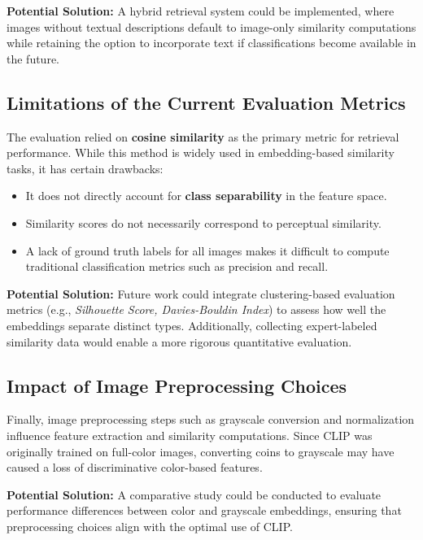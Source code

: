 \documentclass[nolibertine, english, algorithm, nomencl, minted]{ttlab-qualify}
\begin{document}
\textbf{Potential Solution:} A hybrid retrieval system could be implemented, where images without textual descriptions 
default to image-only similarity computations while retaining the option to incorporate text if classifications become 
available in the future.

\subsection{Limitations of the Current Evaluation Metrics}
\label{subsec:evaluation_limits}

The evaluation relied on \textbf{cosine similarity} as the primary metric for retrieval performance. 
While this method is widely used in embedding-based similarity tasks, it has certain drawbacks:
\begin{itemize}
    \item It does not directly account for \textbf{class separability} in the feature space.
    \item Similarity scores do not necessarily correspond to perceptual similarity.
    \item A lack of ground truth labels for all images makes it difficult to compute traditional classification metrics such 
    as precision and recall.
\end{itemize}

\textbf{Potential Solution:} Future work could integrate clustering-based evaluation metrics 
(e.g., \textit{Silhouette Score, Davies-Bouldin Index}) to assess how well the embeddings separate distinct types. 
Additionally, collecting expert-labeled similarity data would enable a more rigorous quantitative evaluation.

\subsection{Impact of Image Preprocessing Choices}
\label{subsec:image_preprocessing}

Finally, image preprocessing steps such as grayscale conversion and normalization influence feature extraction 
and similarity computations. Since CLIP was originally trained on full-color images, converting coins to grayscale may have 
caused a loss of discriminative color-based features.

\textbf{Potential Solution:} A comparative study could be conducted to evaluate performance differences between color and 
grayscale embeddings, ensuring that preprocessing choices align with the optimal use of CLIP.
\end{document}
